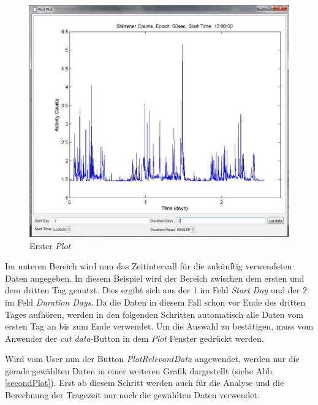 \documentclass[onecolumn,german]{article}
\begin{document}
\begin{figure}[H]
\centerline{
\includegraphics[width=125mm, height=100mm]{Abbildungen/FirstPlot.JPG}
}
\caption {Erster \textit{Plot}}
\label{firstPlot}
\end{figure}

Im unteren Bereich wird nun das Zeitintervall für die zukünftig verwendeten Daten angegeben. In diesem Beispiel wird der Bereich zwischen dem ersten und dem dritten Tag genutzt. Dies ergibt sich aus der 1 im Feld \textit{Start Day} und der 2 im Feld \textit{Duration Days}. Da die Daten in diesem Fall schon vor Ende des dritten Tages aufhören, werden in den folgenden Schritten automatisch alle Daten vom ersten Tag an bis zum Ende verwendet. Um die Auswahl zu bestätigen, muss vom Anwender der \textit{cut data}-Button in dem \textit{Plot} Fenster gedrückt werden.\newline


Wird vom User nun der Button \textit{PlotRelevantData} angewendet, werden nur die gerade gewählten Daten in einer weiteren Grafik dargestellt (siehe Abb. \ref{secondPlot}). Erst ab diesem Schritt werden auch für die Analyse und die Berechnung der Tragezeit nur noch die gewählten Daten verwendet.
\end{document}
